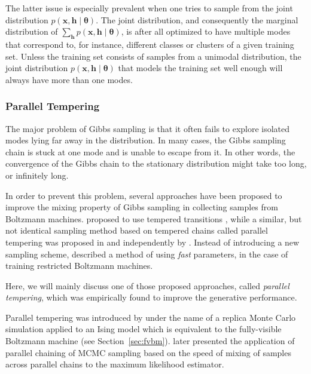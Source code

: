 \documentclass[dissertation,nocontribution,draft*]{aaltoseries}
\newcommand{\vect}[1]{\mathbf{#1}}
\newcommand{\vects}[1]{\boldsymbol{#1}}
\newcommand{\vh}[0]{\vect{h}}
\newcommand{\vx}[0]{\vect{x}}
\newcommand{\TT}[0]{{\vects{\theta}}}
\begin{document}
The latter issue is especially prevalent when one tries to sample
from the joint distribution $p(\vx, \vh \mid \TT)$.  The
joint distribution, and consequently the marginal
distribution of $\sum_{\vh} p(\vx, \vh \mid \TT)$, is after
all optimized to have multiple modes that correspond to,
for instance, different classes or clusters of a given
training set. Unless the training set consists of samples
from a unimodal distribution, the joint distribution $p(\vx,
\vh \mid \TT)$ that models the training set well enough will
always have more than one modes.


\subsubsection{Parallel Tempering}
\label{sec:parallel_tempering}


The major problem of Gibbs sampling is that it often
fails to explore isolated modes lying far away in the
distribution.  In many cases, the Gibbs sampling chain is
stuck at one mode and is unable to escape from it. In other
words, the convergence of the Gibbs chain to the stationary
distribution might take too long, or infinitely long.

In order to prevent this problem, several approaches have
been proposed to improve the mixing property of Gibbs
sampling in collecting samples from Boltzmann machines.
\citet{Salakhutdinov2009} proposed to use tempered
transitions \citep{Neal1994}, while a similar, but not
identical sampling method based on tempered chains called
parallel tempering was proposed in
 and independently by
\citet{Desjardins2010,Desjardins2010a}.  Instead of
introducing a new sampling scheme, \citet{Tieleman2009}
described a method of using \textit{fast} parameters,
in the case of training restricted Boltzmann
machines.

Here, we will mainly discuss one of those proposed
approaches, called \textit{parallel tempering}, which was
empirically found to improve the generative performance.

Parallel tempering was introduced by \citet{Swendsen1986}
under the name of a replica Monte Carlo simulation applied
to an Ising model which is equivalent to the fully-visible
Boltzmann machine (see Section~\ref{sec:fvbm}).
\citet{Geyer1991} later presented the application of
parallel chaining of MCMC sampling based on the speed of
mixing of samples across parallel chains to the maximum
likelihood estimator.
\end{document}
